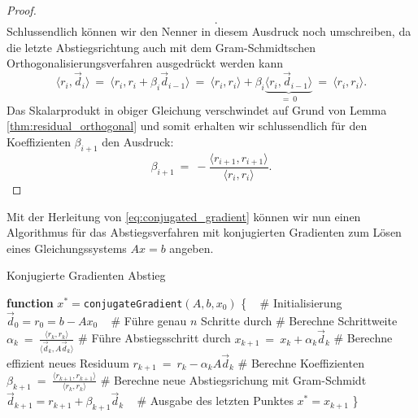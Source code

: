 \begin{proof}
\begin{equation*}
\begin{split}
\end{split}.
\end{equation*}
Schlussendlich können wir den Nenner in diesem Ausdruck noch umschreiben, da die letzte Abstiegsrichtung auch mit dem Gram-Schmidtschen Orthogonalisierungsverfahren ausgedrückt werden kann 
\begin{equation*}
\langle r_i, \vec{d}_i \rangle \ = \ \langle r_i, r_i + \beta_i \vec{d}_{i-1} \rangle \ = \ \langle r_i, r_i \rangle + \beta_i \underbrace{\langle r_i, \vec{d}_{i-1}\rangle}_{=~0} \ = \ \langle r_i, r_i \rangle.
\end{equation*}
Das Skalarprodukt in obiger Gleichung verschwindet auf Grund von Lemma \ref{thm:residual_orthogonal} und somit erhalten wir schlussendlich für den Koeffizienten $\beta_{i+1}$ den Ausdruck:
\begin{equation*}
\beta_{i+1} \ = \ -\frac{\langle r_{i+1}, r_{i+1}\rangle}{\langle r_i, r_i \rangle}.
\end{equation*}
\end{proof}

Mit der Herleitung von \eqref{eq:conjugated_gradient} können wir nun einen Algorithmus für das Abstiegsverfahren mit konjugierten Gradienten zum Lösen eines Gleichungssystems $Ax = b$ angeben.
\begin{algorithm}{Konjugierte Gradienten Abstieg}{}
\label{alg:conjugated_gradient}
\begin{algorithmic}
\STATE \textbf{function} $x^*= $\texttt{conjugateGradient}$(A, b, x_0)$ \{
\STATE ~
\STATE \# Initialisierung
\STATE $\vec{d}_0 = r_0 = b - Ax_0$
\STATE ~
\STATE \# Führe genau $n$ Schritte durch
\STATE \# Berechne Schrittweite
\STATE $\alpha_k \ = \ \frac{\langle r_k, r_k\rangle}{\langle \vec{d}_k, A \vec{d}_k\rangle}$
\STATE \# Führe Abstiegsschritt durch
\STATE $x_{k+1} \ = \ x_k + \alpha_k \vec{d}_k$
\STATE \# Berechne effizient neues Residuum
\STATE $r_{k+1} \ = \ r_k - \alpha_k A\vec{d}_k$
\STATE \# Berechne Koeffizienten
\STATE $\beta_{k+1} \ = \ \frac{\langle r_{k+1}, r_{k+1}\rangle}{\langle r_k, r_k \rangle}$
\STATE \# Berechne neue Abstiegsrichung mit Gram-Schmidt
\STATE $\vec{d}_{k+1} = r_{k+1} + \beta_{k+1} \vec{d}_k$
\ENDIF
\ENDFOR
\STATE ~
\STATE \# Ausgabe des letzten Punktes
\STATE $x^* = x_{k+1}$
\STATE \}
\end{algorithmic}
\end{algorithm}

